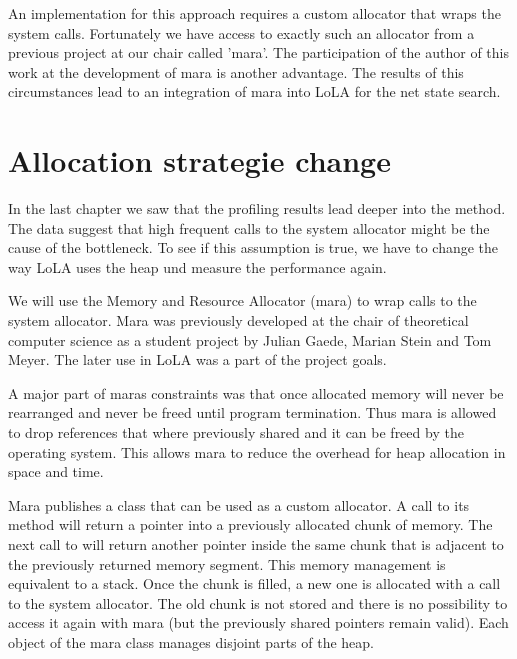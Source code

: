 An implementation for this approach requires a custom allocator that wraps the system calls. Fortunately we have access to exactly such an allocator from a previous project at our chair called 'mara'. The participation of the author of this work at the development of mara is another advantage. The results of this circumstances lead to an integration of mara into LoLA for the net state search.

\section{Allocation strategie change}
In the last chapter we saw that the profiling results lead deeper into the  method. The data suggest that high frequent calls to the system allocator might be the cause of the bottleneck. To see if this assumption is true, we have to change the way LoLA uses the heap und measure the performance again.

We will use the Memory and Resource Allocator (mara) to wrap calls to the system allocator. Mara was previously developed at the chair of theoretical computer science as a student project by Julian Gaede, Marian Stein and Tom Meyer. The later use in LoLA was a part of the project goals.

A major part of maras constraints was that once allocated memory will never be rearranged and never be freed until program termination. Thus mara is allowed to drop references that where previously shared and it can be freed by the operating system. This allows mara to reduce the overhead for heap allocation in space and time.

Mara publishes a class that can be used as a custom allocator. A call to its  method will return a pointer into a previously allocated chunk of memory. The next call to  will return another pointer inside the same chunk that is adjacent to the previously returned memory segment. This memory management is equivalent to a stack. Once the chunk is filled, a new one is allocated with a call to the system allocator. The old chunk is not stored and there is no possibility to access it again with mara (but the previously shared pointers remain valid). Each object of the mara class manages disjoint parts of the heap.

